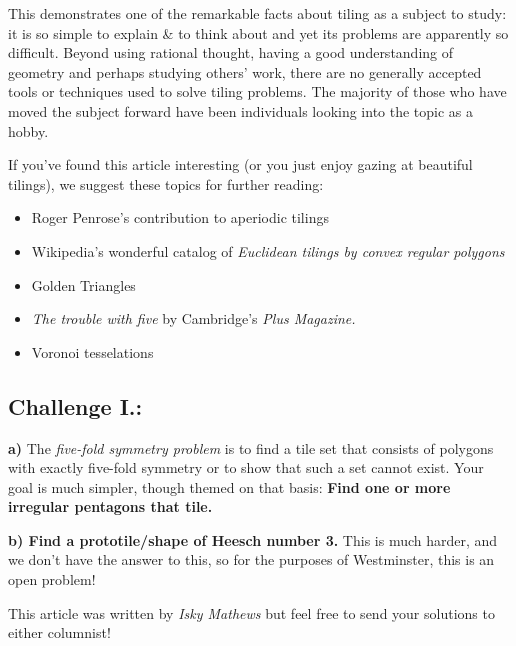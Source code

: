 This demonstrates one of the remarkable facts about tiling as a subject
to study: it is so simple to explain \& to think about and yet its
problems are apparently so difficult. Beyond using rational thought,
having a good understanding of geometry and perhaps studying others'
work, there are no generally accepted tools or techniques used to solve
tiling problems. The majority of those who have moved the subject
forward have been individuals looking into the topic as a hobby.

If you've found this article interesting (or you just enjoy gazing at
beautiful tilings), we suggest these topics for further reading:

\begin{itemize}
\item
  Roger Penrose's contribution to aperiodic tilings
\item
  Wikipedia's wonderful catalog of \emph{Euclidean tilings by convex
  regular polygons}
\item
  Golden Triangles
\item
  \emph{The trouble with five }by Cambridge's \emph{Plus Magazine.}
\item
  Voronoi tesselations
\end{itemize}

\subsection{Challenge I.:}\label{challenge-i.}

\textbf{a) }The \emph{five-fold symmetry problem }is to find a tile set
that consists of polygons with exactly five-fold symmetry or to show
that such a set cannot exist. Your goal is much simpler, though themed
on that basis: \textbf{Find one or more irregular pentagons that tile.}

\textbf{b) Find a prototile/shape of Heesch number 3. }This is much
harder, and we don't have the answer to this, so for the purposes of
Westminster, this is an open problem!

This article was written by \emph{Isky Mathews} but feel free to send
your solutions to either columnist!
